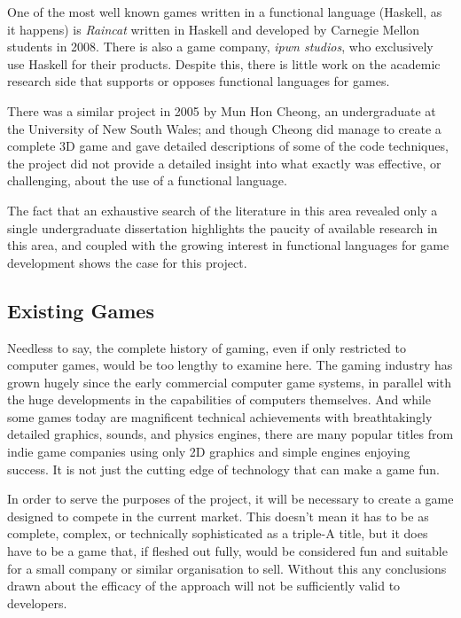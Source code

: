 One of the most well known games written in a functional language (Haskell, as it happens) is \emph{Raincat} written in Haskell and developed by Carnegie Mellon students in 2008. There is also a game company, \emph{ipwn studios}, who exclusively use Haskell for their products. Despite this, there is little work on the academic research side that supports or opposes functional languages for games. 

There was a similar project in 2005 by Mun Hon Cheong, an undergraduate at the University of New South Wales;\cite{cheong2005functional} and though Cheong did manage to create a complete 3D game and gave detailed descriptions of some of the code techniques, the project did not provide a detailed insight into what exactly was effective, or challenging, about the use of a functional language.

The fact that an exhaustive search of the literature in this area revealed only a single undergraduate dissertation highlights the paucity of available research in this area, and coupled with the growing interest in functional languages for game development shows the case for this project.

\subsection{Existing Games}

Needless to say, the complete history of gaming, even if only restricted to computer games, would be too lengthy to examine here. The gaming industry has grown hugely since the early commercial computer game systems, in parallel with the huge developments in the capabilities of computers themselves. And while some games today are magnificent technical achievements with breathtakingly detailed graphics, sounds, and physics engines, there are many popular titles from indie game companies using only 2D graphics and simple engines enjoying success. It is not just the cutting edge of technology that can make a game fun.

In order to serve the purposes of the project, it will be necessary to create a game designed to compete in the current market. This doesn't mean it has to be as complete, complex, or technically sophisticated as a triple-A title, but it does have to be a game that, if fleshed out fully, would be considered fun and suitable for a small company or similar organisation to sell. Without this any conclusions drawn about the efficacy of the approach will not be sufficiently valid to developers.

